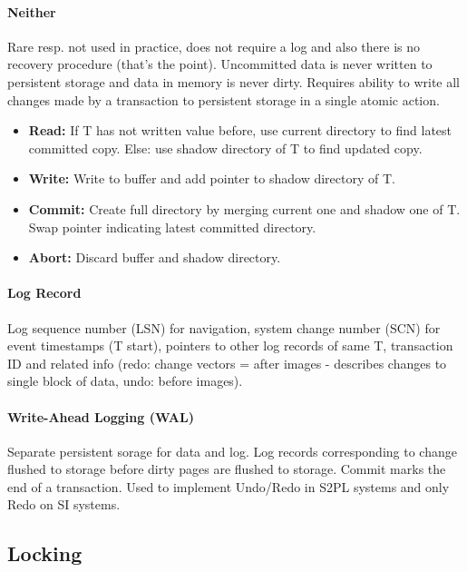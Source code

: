 \paragraph{Neither}
Rare resp. not used in practice, does not require a log and also there is no recovery procedure (that's the point). Uncommitted data is never written to persistent storage and data in memory is never dirty. Requires ability to write all changes made by a transaction to persistent storage in a single atomic action. %
\begin{itemize}
    \item \textbf{Read:} If T has not written value before, use current directory to find latest committed copy. Else: use shadow directory of T to find updated copy.
    \item \textbf{Write:} Write to buffer and add pointer to shadow directory of T.
    \item \textbf{Commit:} Create full directory by merging current one and shadow one of T. Swap pointer indicating latest committed directory.
    \item \textbf{Abort:} Discard buffer and shadow directory.
\end{itemize} %

\paragraph{Log Record}
Log sequence number (LSN) for navigation, system change number (SCN) for event timestamps (T start), pointers to other log records of same T, transaction ID and related info (redo: change vectors = after images - describes changes to single block of data, undo: before images).


\paragraph{Write-Ahead Logging (WAL)}
Separate persistent sorage for data and log. Log records corresponding to change flushed to storage before dirty pages are flushed to storage. Commit marks the end of a transaction. Used to implement Undo/Redo in S2PL systems and only Redo on SI systems.




\subsection{Locking}

